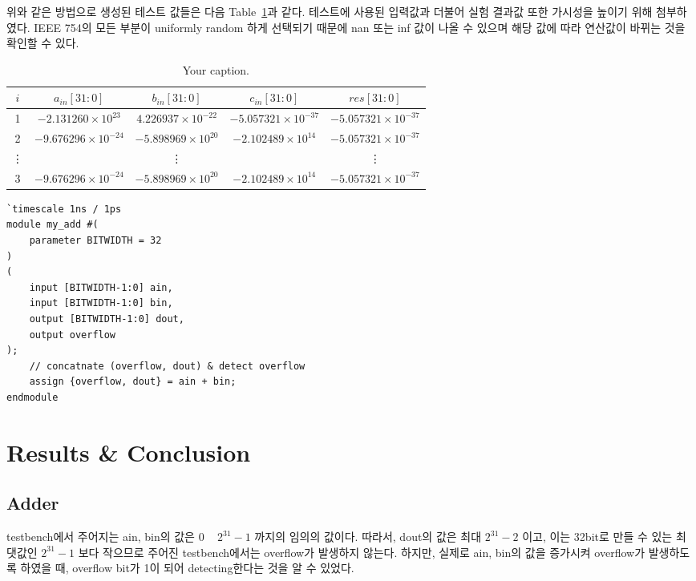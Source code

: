 \documentclass{article}
\begin{document}
위와 같은 방법으로 생성된 테스트 값들은 다음 Table~\ref{tab1}과 같다. 테스트에 사용된 입력값과 더불어 실험 결과값 또한 가시성을 높이기 위해 첨부하였다. IEEE 754의 모든 부분이 uniformly random 하게 선택되기 때문에 nan 또는 inf 값이 나올 수 있으며 해당 값에 따라 연산값이 바뀌는 것을 확인할 수 있다.
\begin{table}[ht]
\renewcommand{\arraystretch}{1.5}
\begin{center}
\begin{tabular}{ |c | ccc | c |} 
 \hline
 $i$ & $a_{in}[31:0]$ & $b_{in}[31:0]$ & $c_{in}[31:0]$ & $res[31:0]$  \\ 
 \hline
1 & $-2.131260 \times 10^{23}$ 		& $4.226937 \times 10^{-22}$		& $-5.057321 \times 10^{-37}$	& $-5.057321 \times 10^{-37}$ \\
2 & $-9.676296 \times 10^{-24}$ 		& $-5.898969 \times 10^{20}$ 		& $-2.102489 \times 10^{14}$	& $-5.057321 \times 10^{-37}$  \\ 
\vdots& & \vdots & & \vdots \\
3 & $-9.676296 \times 10^{-24}$ 		& $-5.898969 \times 10^{20}$ 		& $-2.102489 \times 10^{14}$	& $-5.057321 \times 10^{-37}$  \\ 
 \hline
\end{tabular}
\caption{Your caption.}\label{tab1}
\end{center}
\end{table}



\begin{lstlisting}[style={verilog-style}]
`timescale 1ns / 1ps
module my_add #(
    parameter BITWIDTH = 32
)
(
    input [BITWIDTH-1:0] ain,
    input [BITWIDTH-1:0] bin,
    output [BITWIDTH-1:0] dout,
    output overflow
);
    // concatnate (overflow, dout) & detect overflow
    assign {overflow, dout} = ain + bin;
endmodule
\end{lstlisting}

\section{Results \& Conclusion}

\subsection{Adder}
testbench에서 주어지는 ain, bin의 값은 0 ~ $2^{31}-1$ 까지의 임의의 값이다.
따라서, dout의 값은 최대 $2^{31}-2$  이고, 이는 32bit로 만들 수 있는 최댓값인 $2^{31}-1$  보다 작으므로 주어진 testbench에서는 overflow가 발생하지 않는다.
하지만, 실제로 ain, bin의 값을 증가시켜 overflow가 발생하도록 하였을 때, overflow bit가 1이 되어 detecting한다는 것을 알 수 있었다.
\end{document}
